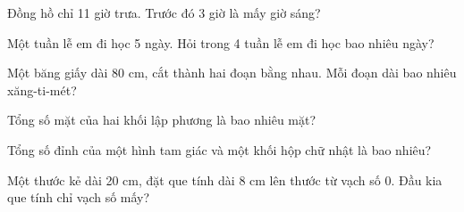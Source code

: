 \begin{ex}
Đồng hồ chỉ 11 giờ trưa. Trước đó 3 giờ là mấy giờ sáng?
\end{ex}

\begin{ex}
Một tuần lễ em đi học 5 ngày. Hỏi trong 4 tuần lễ em đi học bao nhiêu ngày?
\end{ex}

\begin{ex}
Một băng giấy dài 80 cm, cắt thành hai đoạn bằng nhau. Mỗi đoạn dài bao nhiêu xăng-ti-mét?
\end{ex}

\begin{ex}
Tổng số mặt của hai khối lập phương là bao nhiêu mặt?
\end{ex}

\begin{ex}
Tổng số đỉnh của một hình tam giác và một khối hộp chữ nhật là bao nhiêu?
\end{ex}

\begin{ex}
Một thước kẻ dài 20 cm, đặt que tính dài 8 cm lên thước từ vạch số 0. Đầu kia que tính chỉ vạch số mấy?
\end{ex}
